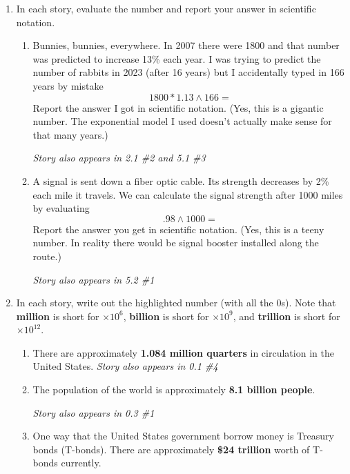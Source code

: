 \begin{enumerate}
\newpage %

\item In each story, evaluate the number and report your answer in scientific notation.
\begin{enumerate}
\item Bunnies, bunnies, everywhere.  In 2007 there were 1800 and that number was predicted to increase 13\% each year.  I was trying to predict the number of rabbits in 2023 (after 16 years) but I accidentally typed in 166 years by mistake $$1800 \ast 1.13 \wedge 166=$$
Report the answer I got in scientific notation.  (Yes, this is a gigantic number.  The exponential model I used doesn't actually make sense for that many years.)   

\hfill \emph{Story also appears in 2.1 \#2 and 5.1 \#3}\vfill
\item A signal is sent down a fiber optic cable.  Its strength decreases by 2\% each mile it travels. We can calculate the signal strength after 1000 miles by evaluating $$.98 \wedge 1000=$$
Report the answer you get in scientific notation. (Yes, this is a teeny number.  In reality there would be signal booster installed along the route.)

\hfill \emph{Story also appears in 5.2 \#1} \vfill
\end{enumerate}

\item In each story, write out the highlighted number (with all the 0s).  Note that \textbf{million} is short for $\times 10^6$, \textbf{billion} is short for $\times 10^9$, and \textbf{trillion} is short for $\times 10^{12}$.
\begin{enumerate}
\item There are approximately \textbf{1.084 million quarters} in circulation in the United States. \hfill \emph{Story also appears in 0.1 \#4} \vfill
\item The population of the world is approximately  \textbf{8.1 billion people}. 

\hfill \emph{Story also appears in 0.3 \#1} \vfill

\item One way that the United States government borrow money is Treasury bonds (T-bonds).  %
There are approximately 
 \textbf{\$24 trillion} worth of T-bonds currently.  \vfill
\end{enumerate}

\end{enumerate}


